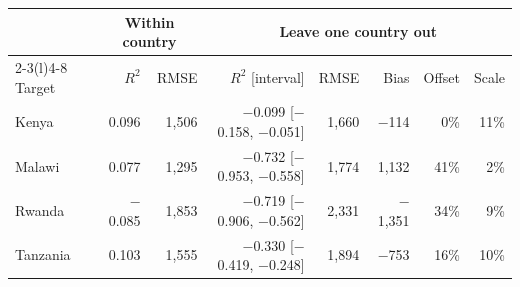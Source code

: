 \begin{tabular}{@{}lrrrrrrr@{}}
\toprule
 & \multicolumn{2}{c}{Within country} & \multicolumn{5}{c}{Leave one country out} \\
\cmidrule(lr){2-3}\cmidrule(l){4-8}
Target & $R^2$ & RMSE & $R^2$ [interval] & RMSE & Bias & Offset & Scale \\
\midrule
Kenya & 0.096 & 1{,}506 & $-$0.099 [$-$0.158, $-$0.051] & 1{,}660 & $-$114 & 0\% & 11\% \\
Malawi & 0.077 & 1{,}295 & $-$0.732 [$-$0.953, $-$0.558] & 1{,}774 & 1{,}132 & 41\% & 2\% \\
Rwanda & $-$0.085 & 1{,}853 & $-$0.719 [$-$0.906, $-$0.562] & 2{,}331 & $-$1{,}351 & 34\% & 9\% \\
Tanzania & 0.103 & 1{,}555 & $-$0.330 [$-$0.419, $-$0.248] & 1{,}894 & $-$753 & 16\% & 10\% \\
\bottomrule
\end{tabular}
